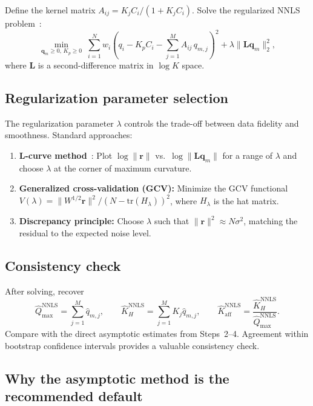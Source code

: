 \documentclass[12pt]{article}
\begin{document}
Define the kernel matrix $A_{ij}=K_j C_i/(1+K_j C_i)$.  Solve the
regularized NNLS problem~\cite{Tikhonov1977,Hansen1998}:
\begin{equation}
  \min_{\bm{q}_m\ge 0,\,K_p\ge 0}\;
  \sum_{i=1}^{N} w_i\left(q_i - K_p C_i
    - \sum_{j=1}^{M} A_{ij}\,q_{m,j}\right)^2
  + \lambda \|\bm{L}\bm{q}_m\|_2^2,
  \label{eq:nnls_reg}
\end{equation}
where $\bm{L}$ is a second-difference matrix in $\log K$ space.

\subsection{Regularization parameter selection}

The regularization parameter $\lambda$ controls the trade-off between
data fidelity and smoothness.  Standard approaches:
\begin{enumerate}[nosep]
  \item \textbf{L-curve method}~\cite{Hansen1992}: Plot  $\log\|\bm{r}\|$ vs.\ $\log\|\bm{L}\bm{q}_m\|$ for a range  of $\lambda$ and choose $\lambda$ at the corner of maximum curvature.
  \item \textbf{Generalized cross-validation (GCV):} Minimize the  GCV functional $V(\lambda)=\|W^{1/2}\bm{r}\|^2/(N-\mathrm{tr}(H_\lambda))^2$,  where $H_\lambda$ is the hat matrix.
  \item \textbf{Discrepancy principle:} Choose $\lambda$ such that $\|\bm{r}\|^2\approx N\sigma^2$, matching the residual to the expected noise level.
\end{enumerate}

\subsection{Consistency check}

After solving, recover
\begin{equation}
  \widehat{Q}_{\max}^{\mathrm{NNLS}} = \sum_{j=1}^{M}\widehat{q}_{m,j},
  \qquad
  \widehat{K}_H^{\mathrm{NNLS}} = \sum_{j=1}^{M} K_j\widehat{q}_{m,j},
  \qquad
  \widehat{K}_{\mathrm{aff}}^{\mathrm{NNLS}}
    = \frac{\widehat{K}_H^{\mathrm{NNLS}}}{\widehat{Q}_{\max}^{\mathrm{NNLS}}}.
\end{equation}
Compare with the direct asymptotic estimates from Steps~2--4.
Agreement within bootstrap confidence intervals provides a valuable
consistency check.

\subsection{Why the asymptotic method is the recommended default}
\end{document}
